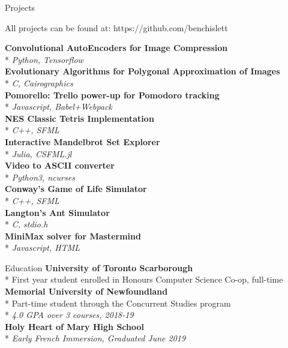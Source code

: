 \documentclass[11pt, letterpaper]{article}
\begin{document}
\begin{section}{Projects}

All projects can be found at:
https://github.com/benchislett

\begin{multicols}{2}
\textbf{Convolutional AutoEncoders for Image Compression}\\*
\textit{Python, Tensorflow}\\

\textbf{Evolutionary Algorithms for Polygonal Approximation of Images}\\*
\textit{C, Cairographics}\\

\textbf{Pomorello: Trello power-up for Pomodoro tracking}\\*
\textit{Javascript, Babel+Webpack}\\

\textbf{NES Classic Tetris Implementation}\\*
\textit{C++, SFML}\\

\textbf{Interactive Mandelbrot Set Explorer}\\*
\textit{Julia, CSFML.jl}\\

\textbf{Video to ASCII converter}\\*
\textit{Python3, ncurses}\\

\textbf{Conway's Game of Life Simulator}\\*
\textit{C++, SFML}\\

\textbf{Langton's Ant Simulator}\\*
\textit{C, stdio.h}\\

\textbf{MiniMax solver for Mastermind}\\*
\textit{Javascript, HTML}
\end{multicols}

\end{section}

\begin{section}{Education}
\textbf{University of Toronto Scarborough}\\*
First year student enrolled in Honours Computer Science Co-op, full-time\\

\textbf{Memorial University of Newfoundland}\\*
Part-time student through the Concurrent Studies program\\*
\textit{4.0 GPA over 3 courses, 2018-19}\\

\textbf{Holy Heart of Mary High School}\\*
\textit{Early French Immersion, Graduated June 2019}
\end{section}
\end{document}
